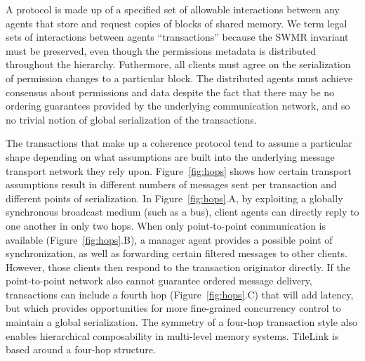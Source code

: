 A protocol is made up of a specified set of allowable interactions between any agents that store and request copies of blocks of shared memory.
We term legal sets of interactions between agents ``transactions'' because the SWMR invariant must be preserved,
even though the permissions metadata is distributed throughout the hierarchy.
Futhermore, all clients must agree on the serialization of permission changes to a particular block.
The distributed agents must achieve consensus about permissions and data despite the fact that there may be no ordering guarantees
provided by the underlying communication network, and so no trivial notion of global serialization of the transactions.

The transactions that make up a coherence protocol tend to assume a particular shape depending on what
assumptions are built into the underlying message transport network they rely upon.
Figure~\ref{fig:hops} shows how certain transport assumptions result in different numbers of messages sent per transaction and different points of serialization.
In Figure~\ref{fig:hops}.A, by exploiting a globally synchronous broadcast medium (such as a bus), client agents can directly reply to one another in only two hops.
When only point-to-point communication is available (Figure~\ref{fig:hops}.B), a manager agent provides a possible point of synchronization, as well as forwarding certain filtered messages to other clients.
However, those clients then respond to the transaction originator directly.
If the point-to-point network also cannot guarantee ordered message delivery, transactions can include a fourth hop (Figure~\ref{fig:hops}.C)
that will add latency, but which provides opportunities for more fine-grained concurrency control to maintain a global serialization.
The symmetry of a four-hop transaction style also enables hierarchical composability in multi-level memory systems.
TileLink is based around a four-hop structure.


